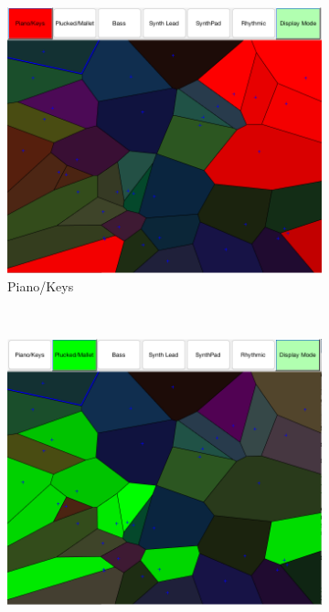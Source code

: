 \documentclass[11pt, oneside]{report}   	%
\begin{document}
\begin{figure}
	\centering
	\begin{subfigure}[b]{0.48\textwidth}
		\includegraphics[width=\textwidth]{CategoryPianoKeys.png}
		\caption{Piano/Keys}
		\label{fig:categoriesPianoKeys}
	\end{subfigure}
	~ %
	\begin{subfigure}[b]{0.48\textwidth}
		\includegraphics[width=\textwidth]{CategoryPluckedMallet.png}

\end{subfigure}
\end{figure}
\end{document}

